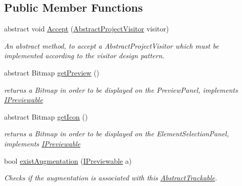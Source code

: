 \subsection*{Public Member Functions}
\begin{DoxyCompactItemize}
\item 
abstract void \hyperlink{class_a_rdev_kit_1_1_model_1_1_project_1_1_abstract_trackable_a76f6ad0ed8f615b8f5b7738411abb54f}{Accept} (\hyperlink{class_a_rdev_kit_1_1_controller_1_1_project_controller_1_1_abstract_project_visitor}{Abstract\-Project\-Visitor} visitor)
\begin{DoxyCompactList}\small\item\em An abstract method, to accept a Abstract\-Project\-Visitor which must be implemented according to the visitor design pattern. \end{DoxyCompactList}\item 
abstract Bitmap \hyperlink{class_a_rdev_kit_1_1_model_1_1_project_1_1_abstract_trackable_ab4d8a1902c82fe7a1d385d5688f92bd8}{get\-Preview} ()
\begin{DoxyCompactList}\small\item\em returns a Bitmap in order to be displayed on the Preview\-Panel, implements \hyperlink{interface_a_rdev_kit_1_1_model_1_1_project_1_1_i_previewable}{I\-Previewable} \end{DoxyCompactList}\item 
abstract Bitmap \hyperlink{class_a_rdev_kit_1_1_model_1_1_project_1_1_abstract_trackable_abee7e96dac48f6fa7fc424c0f9139dff}{get\-Icon} ()
\begin{DoxyCompactList}\small\item\em returns a Bitmap in order to be displayed on the Element\-Selection\-Panel, implements \hyperlink{interface_a_rdev_kit_1_1_model_1_1_project_1_1_i_previewable}{I\-Previewable} \end{DoxyCompactList}\item 
bool \hyperlink{class_a_rdev_kit_1_1_model_1_1_project_1_1_abstract_trackable_ac5dfdc39c3e7ad91ca9156208278b108}{exist\-Augmentation} (\hyperlink{interface_a_rdev_kit_1_1_model_1_1_project_1_1_i_previewable}{I\-Previewable} a)
\begin{DoxyCompactList}\small\item\em Checks if the augmentation is associated with this \hyperlink{class_a_rdev_kit_1_1_model_1_1_project_1_1_abstract_trackable}{Abstract\-Trackable}. \end{DoxyCompactList}\item 

\end{DoxyCompactItemize}
